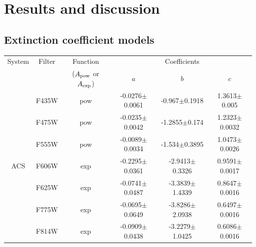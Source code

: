 \documentclass[12pt, a4paper]{report}
\begin{document}
\chapter{Results and discussion}
\section{Extinction coefficient models} \label{coef_models}

\begin{table}
\begin{center}
\begin{tabular}{cccccc}
\hline
System & Filter &  Function & & Coefficients & \\
 & & ($A_{\textnormal{pow}}$ or $A_{\textnormal{exp}}$) & $a$ & $b$ & $c$ \\
\hline

& F435W & pow & -0.0276$\pm$0.0061 & -0.967$\pm$0.1918 & 1.3613$\pm$0.005 \\
& F475W & pow & -0.0235$\pm$0.0042 & -1.2855$\pm$0.174 & 1.2323$\pm$0.0032 \\
& F555W & pow & -0.0089$\pm$0.0034 & -1.534$\pm$0.3895 & 1.0473$\pm$0.0026 \\
ACS & F606W & exp & -0.2295$\pm$0.0361 & -2.9413$\pm$0.3326 & 0.9591$\pm$0.0017 \\
& F625W & exp & -0.0741$\pm$0.0487 & -3.3839$\pm$1.4339 & 0.8647$\pm$0.0016 \\
& F775W & exp & -0.0695$\pm$0.0649 & -3.8286$\pm$2.0938 & 0.6497$\pm$0.0016 \\
& F814W & exp & -0.0909$\pm$0.0438 & -3.2279$\pm$1.0425 & 0.6086$\pm$0.0016 \\ \hline



\end{tabular}
\end{center}
\end{table}
\end{document}
